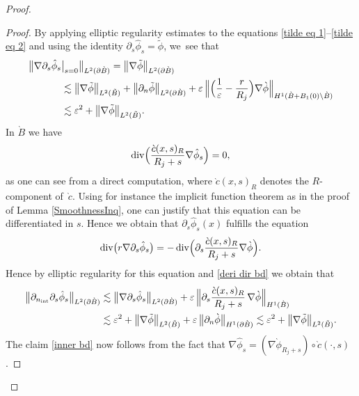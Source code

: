 \documentclass[10pt]{amsart}
\let\epsilon\varepsilon
\let\backslash\setminus
\theoremstyle{definition}
\renewcommand{\div}{\operatorname{div}}
\newcommand\bnorm[1]{\bigl\lVert #1\bigr\rVert}
\newcommand\Bnorm[1]{\Bigl\lVert #1\Bigr\rVert}
\newcommand\eq{=}
\let\de\partial
\let\eps\epsilon
\let\mel\relax
\begin{document}
\begin{proof}
\begin{proof}
By applying elliptic regularity estimates to the equations \eqref{tilde eq 1}--\eqref{tilde eq 2} and using the identity $\de_s\hat{\phi}_s=\tilde{\phi}$, we~see that
\begin{equation}\begin{aligned}
\bigl\|\nabla\de_s\hat{\phi}_s&\big|_{s=0}\bigr\|_{L^2(\de\grave{B})}\eq\bnorm{\nabla\tilde{\phi}}_{L^2(\de\grave{B})}\\
&\lesssim \bnorm{\nabla\tilde{\phi}}_{L^2(\tilde{B})}+\bnorm{\de_n\tilde{\phi}}_{L^2(\de\grave{B})}+\eps\,\Bnorm{\Bigl(\frac{1}{\eps}-\frac{r}{R_j}\Bigr)\nabla\grave{\phi}}_{H^1(\grave{B}+B_1(0)\backslash\grave{B})}\\
&\lesssim\eps^2+\bnorm{\nabla\tilde{\phi}}_{L^2(\tilde{B})}.\label{deri dir bd}
\end{aligned}\end{equation}
In $\grave{B}$ we have
\begin{align*}
\div\Bigl(\frac{\grave{c}(x,s)_R}{R_j+s}\nabla\hat{\phi}_s\Bigr)\eq0,
\end{align*}
as one can see from a direct computation, where $\grave{c}(x,s)_R$ denotes the $R$-component of~$\grave{c}$. Using for instance the implicit function theorem as in the proof of Lemma \ref{SmoothnessInq}, one can justify that this equation can be differentiated in $s$.
Hence we obtain that $\de_s\hat{\phi}_s(x)$ fulfills the equation
\begin{align*}
\div\bigl(r\nabla\de_s\hat{\phi}_s\bigr)\eq-\div\Bigl(\de_s\frac{\grave{c}(x,s)_R}{R_j+s}\nabla\grave{\phi}\Bigr).
\end{align*}
Hence by elliptic regularity for this equation and \eqref{deri dir bd} we obtain that
\begin{align*}
\mel\bnorm{\de_{n_\mathrm{int}}\de_s\hat{\phi}_s}_{L^2(\de\grave{B})}&\lesssim \bnorm{\nabla\de_s\hat{\phi}_s}_{L^2(\de\grave{B})}+\eps\,\Bnorm{\de_s\frac{\grave{c}(x,s)_R}{R_j+s}\,\nabla\grave{\phi}}_{H^1(\grave{B})}\\
&\lesssim \eps^2+\bnorm{\nabla\tilde{\phi}}_{L^2(\tilde{B})}+\eps\,\bnorm{\de_n\grave{\phi}}_{H^1(\de\grave{B})}\lesssim \eps^2+\bnorm{\nabla\tilde{\phi}}_{L^2(\tilde{B})}.
\end{align*}
The claim \eqref{inner bd} now follows from the fact that $\nabla\hat{\phi}_s=(\nabla\grave{\phi}_{R_j+s})\circ\grave{c}(\cdot,s)$.


\end{proof}
\end{proof}
\end{document}
